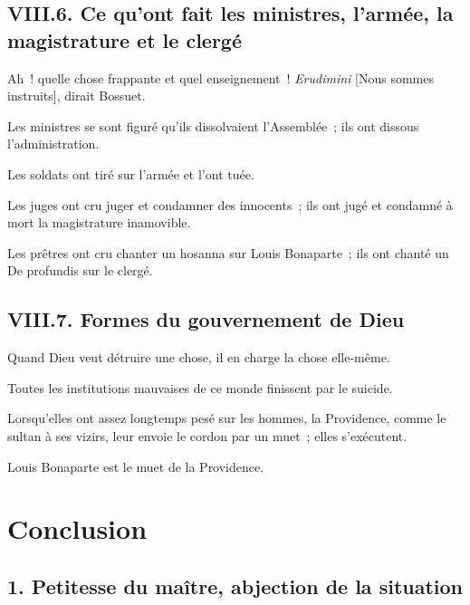 \documentclass[french,twoside]{book} %
\newcommand\chapteropen{} %
\newcommand\chaptercont{} %
\newcommand\chapterclose{} %
\begin{document}
\section[{VIII.6. Ce qu’ont fait les ministres, l’armée, la magistrature et le clergé}]{VIII.6. Ce qu’ont fait les ministres, l’armée, la magistrature et le clergé}

\noindent Ah ! quelle chose frappante et quel enseignement ! \emph{Erudimini} [Nous sommes instruits], dirait Bossuet.\par
Les ministres se sont figuré qu’ils dissolvaient l’Assemblée ; ils ont dissous l’administration.\par
Les soldats ont tiré sur l’armée et l’ont tuée.\par
Les juges ont cru juger et condamner des innocents ; ils ont jugé et condamné à mort la magistrature inamovible.\par
Les prêtres ont cru chanter un hosanna sur Louis Bonaparte ; ils ont chanté un De profundis sur le clergé.

\section[{VIII.7. Formes du gouvernement de Dieu}]{VIII.7. Formes du gouvernement de Dieu}

Quand Dieu veut détruire une chose, il en charge la chose elle-même.\par
Toutes les institutions mauvaises de ce monde finissent par le suicide.\par
Lorsqu’elles ont assez longtemps pesé sur les hommes, la Providence, comme le sultan à ses vizirs, leur envoie le cordon par un muet ; elles s’exécutent.\par
Louis Bonaparte est le muet de la Providence.
\chapterclose


\chapteropen

\chapter[{Conclusion}]{Conclusion}
\renewcommand{\leftmark}{Conclusion}


\chaptercont

\section[{1. Petitesse du maître, abjection de la situation}]{1. Petitesse du maître, abjection de la situation}
\end{document}
